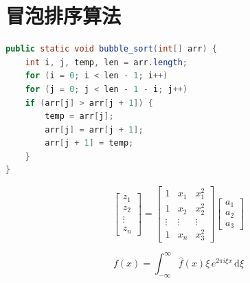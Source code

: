 \documentclass{imutthesis}
\begin{document}
\section{冒泡排序算法}
 \begin{lstlisting}[language=Java]  
public static void bubble_sort(int[] arr) {
	int i, j, temp, len = arr.length;
	for (i = 0; i < len - 1; i++)
	for (j = 0; j < len - 1 - i; j++)
	if (arr[j] > arr[j + 1]) {
		temp = arr[j];
		arr[j] = arr[j + 1];
		arr[j + 1] = temp;
	}
}
 \end{lstlisting} 
\begin{table}[H]
	\centering
	\caption{跑马灯I/O分配表}
\end{table}

\begin{equation} 
	\begin{bmatrix}
		z_{1}\\
		z_{2}\\
		\vdots\\
		z_{n}
	\end{bmatrix}
	=\begin{bmatrix}
		1 & x_{1}  &x_{1}^{2}  \\
		1& x_{2} & x_{2}^{2} \\
		\vdots & \vdots & \vdots\\
		1 & x_{n} & x_{3}^{2}
	\end{bmatrix}
	\begin{bmatrix}
		a_{1} \\
		a_{2} \\
		a_{3} 
	\end{bmatrix}
\end{equation}

\begin{equation}
f(x) = \int_{-\infty}^\infty  \hat f(x)\xi\,e^{2 \pi i \xi x}  \,\mathrm{d}\xi 
\end{equation}
\end{document}
